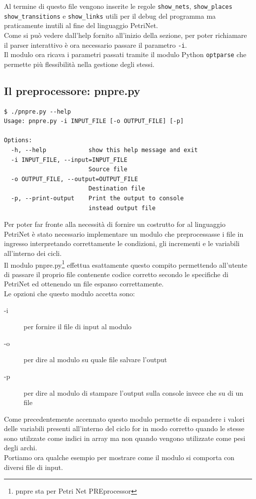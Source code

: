 \documentclass[italian,12pt]{book}
\begin{document}
Al termine di questo file vengono inserite le regole {\tt show\_nets}, {\tt show\_places} {\tt show\_transitions} e {\tt show\_links} utili per il debug del programma ma praticamente inutili al fine del linguaggio PetriNet.\\
Come si può vedere dall'help fornito all'inizio della sezione, per poter
richiamare il parser interattivo è ora necessario passare il parametro {\tt -i}.\\
Il modulo ora ricava i parametri passati tramite il modulo Python {\tt optparse} che 
permette più flessibilità nella gestione degli stessi.

\subsection{Il preprocessore: pnpre.py}
\begin{verbatim}
$ ./pnpre.py --help
Usage: pnpre.py -i INPUT_FILE [-o OUTPUT_FILE] [-p]

Options:
  -h, --help            show this help message and exit
  -i INPUT_FILE, --input=INPUT_FILE
                        Source file
  -o OUTPUT_FILE, --output=OUTPUT_FILE
                        Destination file
  -p, --print-output    Print the output to console 
                        instead output file
\end{verbatim}
Per poter far fronte alla necessità di fornire un costrutto for al
linguaggio PetriNet è stato necessario implementare un modulo che 
preprocessasse i file in ingresso interpretando correttamente le
condizioni, gli incrementi e le variabili all'interno dei cicli.\\
Il modulo pnpre.py\footnote{pnpre sta per Petri Net PREprocessor} 
effettua esattamente questo compito permettendo
all'utente di passare il proprio file contenente codice corretto
secondo le specifiche di PetriNet ed ottenendo un file espanso
correttamente. \\
Le opzioni che questo modulo accetta sono:
\begin{description}
\item[-i] per fornire il file
di input al modulo
\item[-o] per dire al modulo su quale file salvare l'output
\item[-p] per dire al modulo di stampare l'output sulla console
  invece che su di un file
\end{description}
Come precedentemente accennato questo modulo permette di espandere i
valori delle variabili presenti all'interno del ciclo for in modo
corretto quando le stesse sono utilzzate come indici in array ma non
quando vengono utilizzate come pesi degli archi. \\
Portiamo ora qualche esempio per mostrare come il modulo si comporta
con diversi file di input.
\end{document}
